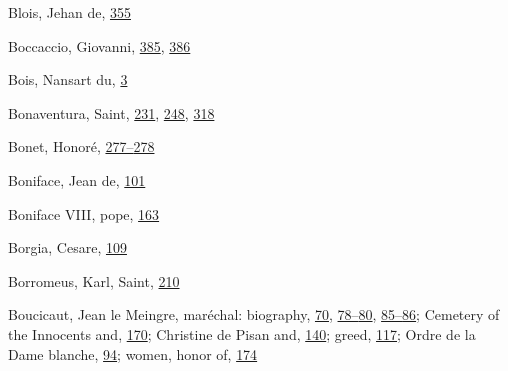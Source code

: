 Blois, Jehan de,
\protect\hyperlink{21_Chapter_Thirteen__IMAGE_AND_WORD.xhtmlux5cux23page_355}{355}

Boccaccio, Giovanni,
\protect\hyperlink{22_Chapter_Fourteen__THE_COMING_OF.xhtmlux5cux23page_385}{385},
\protect\hyperlink{22_Chapter_Fourteen__THE_COMING_OF.xhtmlux5cux23page_386}{386}

Bois, Nansart du,
\protect\hyperlink{08_Chapter_One__THE_PASSIONATE_INTE.xhtmlux5cux23page_3}{3}

Bonaventura, Saint,
\protect\hyperlink{15_Chapter_Eight__RELIGIOUS_EXCITAT.xhtmlux5cux23page_231}{231},
\protect\hyperlink{16_Chapter_Nine__THE_DECLINE_OF_SYM.xhtmlux5cux23page_248}{248},
\protect\hyperlink{20_ILLUSTRATIONS_FOLLOW_PAGE.xhtmlux5cux23page_318}{318}

Bonet, Honoré,
\protect\hyperlink{18_Chapter_Eleven__THE_FORMS_OF_THO.xhtmlux5cux23page_277}{277--}\protect\hyperlink{18_Chapter_Eleven__THE_FORMS_OF_THO.xhtmlux5cux23page_278}{278}

Boniface, Jean de,
\protect\hyperlink{10_Chapter_Three__THE_HEROIC_DREAM.xhtmlux5cux23page_101}{101}

Boniface VIII, pope,
\protect\hyperlink{12_Chapter_Five__THE_VISION_OF_DEAT.xhtmlux5cux23page_163}{163}

Borgia, Cesare,
\protect\hyperlink{10_Chapter_Three__THE_HEROIC_DREAM.xhtmlux5cux23page_109}{109}

Borromeus, Karl, Saint,
\protect\hyperlink{14_Chapter_Seven__THE_PIOUS_PERSONA.xhtmlux5cux23page_210}{210}

Boucicaut, Jean le Meingre, maréchal: biography,
\protect\hyperlink{10_Chapter_Three__THE_HEROIC_DREAM.xhtmlux5cux23page_70}{70},
\protect\hyperlink{10_Chapter_Three__THE_HEROIC_DREAM.xhtmlux5cux23page_78}{78--}\protect\hyperlink{10_Chapter_Three__THE_HEROIC_DREAM.xhtmlux5cux23page_80}{80},
\protect\hyperlink{10_Chapter_Three__THE_HEROIC_DREAM.xhtmlux5cux23page_85}{85--}\protect\hyperlink{10_Chapter_Three__THE_HEROIC_DREAM.xhtmlux5cux23page_86}{86};
Cemetery of the Innocents and,
\protect\hyperlink{12_Chapter_Five__THE_VISION_OF_DEAT.xhtmlux5cux23page_170}{170};
Christine de Pisan and,
\protect\hyperlink{11_Chapter_Four__THE_FORMS_OF_LOVE.xhtmlux5cux23page_140}{140};
greed,
\protect\hyperlink{10_Chapter_Three__THE_HEROIC_DREAM.xhtmlux5cux23page_117}{117};
Ordre de la Dame blanche,
\protect\hyperlink{10_Chapter_Three__THE_HEROIC_DREAM.xhtmlux5cux23page_94}{94};
women, honor of,
\protect\hyperlink{13_Chapter_Six__THE_DEPICTION_OF_TH.xhtmlux5cux23page_174}{174}

